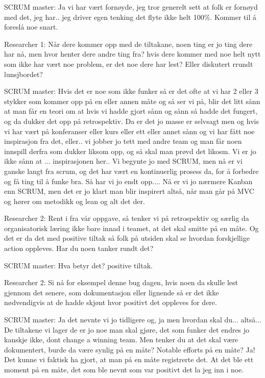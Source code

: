 SCRUM master: Ja vi har vært fornøyde, jeg tror generelt sett at folk er fornøyd med det, jeg har.. jeg driver egen tenking det flyte ikke helt 100\%. Kommer til å foreslå noe snart.

Researcher 1: Når dere kommer opp med de tiltakane, noen ting er jo ting dere har nå, men hvor henter dere andre ting fra? hvis dere kommer med noe helt nytt som ikke har vært noe problem, er det noe dere har lest? Eller diskutert rrundt lunsjbordet?

SCRUM master: Hvis det er noe som ikke funker så er det ofte at vi har 2 eller 3 stykker som kommer opp på en eller annen måte og så ser vi på, blir det litt sånn at man får en teori om at hvis vi hadde gjort sånn og sånn så hadde det fungert, og da dukker det opp på retrospektiv. Da er det jo masse er selvsagt men og hvis vi har vært på konferanser eller kurs eller ett eller annet sånn og vi har fått noe inspirasjon fra det, eller.. vi jobber jo tett med andre team og man får noen innspill derfra som dukker liksom opp, og så skal man prøvd det likosm. Vi er jo ikke sånn at ... inspirasjonen her.. Vi begynte jo med SCRUM, men nå er vi ganske langt fra scrum, og det har vært en kontinuerlig prosess da, for å forbedre og få ting til å funke bra. Så har vi jo endt opp.... Nå er vi jo nærmere Kanban enn SCRUM, men det er jo klart man blir inspirert altså, når man går på MVC og hører om metodikk og lean og alt det der. 

Researcher 2: Rent i fra vår oppgave, så tenker vi på retrospektiv og særlig da organisatorisk læring ikke bare innad i teamet, at det skal smitte på en måte. Og det er da det med positive tiltak så folk på utsiden skal se hvordan forskjellige action oppleves. Har du noen tanker rundt det?

SCRUM master: Hva betyr det? positive tiltak.

Researcher 2: Si nå for eksempel denne bug dagen, hvis noen da skulle lest gjennom det senere, som dokumentasjon eller lignende så er det ikke nødvendigvis at de hadde skjønt hvor positivt det oppleves for dere.

SCRUM master: Ja det nevnte vi jo tidligere og, ja men hvordan skal du... altså... De tiltakene vi lager de er jo noe man skal gjøre, det som funker det endres jo kanskje ikke, dont change a winning team. Men tenker du at det skal være dokumentert, burde da være synlig på en måte? Notable efforts på en måte? Ja! Det kunne vi faktisk ha gjort, at man på en måte registrerte det. At det ble ett moment på en måte, det som ble nevnt som var positivt det la jeg inn i noe. 

